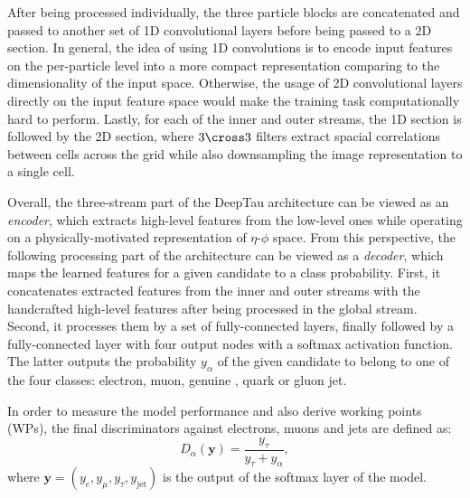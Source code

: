 After being processed individually, the three particle blocks are concatenated and passed to another set of 1D convolutional layers before being passed to a 2D section. In general, the idea of using 1D convolutions is to encode input features on the per-particle level into a more compact representation comparing to the dimensionality of the input space. Otherwise, the  usage of 2D convolutional layers directly on the input feature space would make the training task computationally hard to perform. Lastly, for each of the inner and outer streams, the 1D section is followed by the 2D section, where $3\cross3$ filters extract spacial correlations between cells across the grid while also downsampling the image representation to a single cell. 

Overall, the three-stream part of the DeepTau architecture can be viewed as an \textit{encoder}, which extracts high-level features from the low-level ones while operating on a physically-motivated representation of $\eta$-$\phi$ space. From this perspective, the following processing part of the architecture can be viewed as a \textit{decoder}, which maps the learned features for a given \tauh candidate to a class probability. First, it concatenates extracted features from the inner and outer streams with the handcrafted high-level features after being processed in the global stream. Second, it processes them by a set of fully-connected layers, finally followed by a fully-connected layer with four output nodes with a softmax activation function. The latter outputs the probability $y_\alpha$ of the given \tauh candidate to belong to one of the four classes: electron, muon, genuine \tauh, quark or gluon jet. 

In order to measure the model performance and also derive working points (WPs), the final discriminators against electrons, muons and jets are defined as:
\begin{equation} \label{eq:d_alpha}
    D_\alpha(\bm{y}) = \dfrac{y_\tau}{y_\tau + y_\alpha},
\end{equation}
where $\bm{y} = (y_e, y_\mu, y_\tau, y_\text{jet})$ is the output of the softmax layer of the model.

